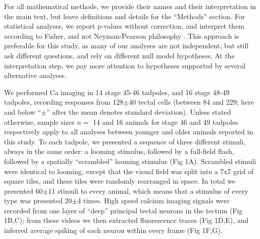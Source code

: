 \documentclass{article}
\begin{document}
For all mathematical methods, we provide their names and their interpretation in the main text, but leave definitions and details for the “Methods” section. For statistical analyses, we report p-values without correction, and interpret them according to Fisher, and not Neyman-Pearson philosophy \citep{greenland2016}. This approach is preferable for this study, as many of our analyses are not independent, but still ask different questions, and rely on different null model hypotheses. At the interpretation step, we pay more attention to hypotheses supported by several alternative analyses.

We performed Ca imaging in 14 stage 45-46 tadpoles, and 16 stage 48-49 tadpoles, recording responses from 128$\pm$40 tectal cells (between 84 and 229; here and below “$\pm$” after the mean denotes standard deviation). Unless stated otherwise, sample sizes $n=$ 14 and 16 animals for stage 46 and 49 tadpoles respectively apply to all analyses between younger and older animals reported in this study. To each tadpole, we presented a sequence of three different stimuli, always in the same order: a looming stimulus, followed by a full-field flash, followed by a spatially “scrambled” looming stimulus (Fig 1A). Scrambled stimuli were identical to looming, except that the visual field was split into a 7x7 grid of square tiles, and these tiles were randomly rearranged in space. In total we presented 60$\pm$11 stimuli to every animal, which means that a stimulus of every type was presented 20$\pm$4 times. High speed calcium imaging signals \citep{xu2011,truszkowski2017} were recorded from one layer of “deep” principal tectal neurons in the tectum (Fig 1B,C); from these videos we then extracted fluorescence traces (Fig 1D,E), and inferred average spiking of each neuron within every frame (Fig 1F,G).
\end{document}
